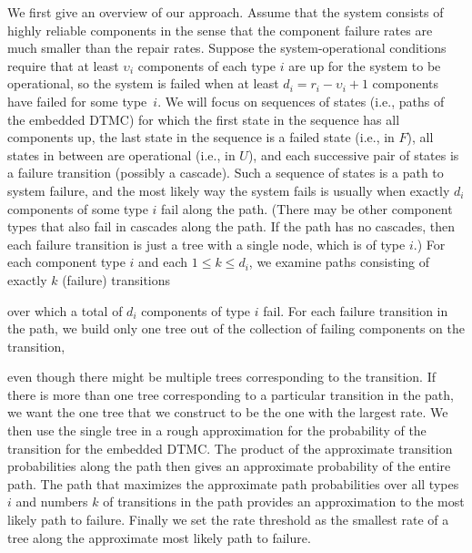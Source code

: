 \documentclass[12pt]{article}
\def\myxoutii{\bgroup \markoverwith{\textcolor{blue}{\hbox to.35em{\hss/\hss}}}\ULon}
\newcommand{\changed}[1]{#1}
\newcommand{\deletedii}[1]{}
\newcommand{\changedii}[1]{#1}
\newcommand{\changed}[1]{\textcolor{red}{#1}}
\newcommand{\changedii}[1]{\textcolor{blue}{#1}}
\newcommand{\deletedii}[1]{{\myxoutii{#1}}}
\begin{document}
\changed{We first give an overview
of our approach.}
Assume that the system consists
of highly reliable components
\cite{GSHNG:1992}
in the sense
that the component
failure rates are much smaller than
the repair rates.
Suppose the system-operational
conditions require that
at least $\upsilon_i$ components
of each type $i$ are up
for the system to be operational,
\changed{so the system is failed
when at least $d_i = r_i - \upsilon_i + 1$
components have failed for some type~$i$.
We will focus on
sequences of states (i.e., paths
of the embedded DTMC)
for which the first state in the
sequence has all components up,
the last state in the sequence is a
failed state (i.e., in $F$),
all states in between are operational
(i.e., in $U$),
and
each successive pair of
states is a failure transition
(possibly a cascade).
Such a sequence of states is a path
to system failure,
and the most likely way the
system fails
is usually
when exactly
$d_i$ components
of some type $i$
fail along the path.
\changedii{(There may be other
component types that also fail
in cascades along the path.
If the path has no cascades, then
each failure transition is just
a tree with a single node, which 
is of type $i$.)}
For each component type $i$
and each $1 \leq k \leq d_i$,
we examine
paths consisting of exactly $k$
(failure) transitions 
\deletedii{(possibly some being cascades)}
\changedii{over} which
a total
of $d_i$ components of type $i$ fail.
For each failure transition in the path,
we \changedii{build only} one tree
\changedii{out of the collection
of failing components on the transition},
\deletedii{(possibly with
just a single node),}
even \changedii{though there might be}
multiple trees corresponding to
\changedii{the} transition.  If there is
more than one tree corresponding to
a particular transition in the path,
\changedii{we want the one tree that
we construct to be the one
with}
the largest rate.
We then use the single tree in a rough
approximation for the probability
of the transition for the embedded DTMC.\@
The product of the approximate transition
probabilities along the path then gives
an approximate probability of the entire path.
The path that
maximizes the approximate path probabilities
over all types $i$ and numbers $k$
of transitions in the path \deletedii{then}
provides an approximation to the
most likely path to failure.
Finally we set the rate threshold
as the smallest rate
of a tree along the approximate most
likely path to failure.}
\end{document}
